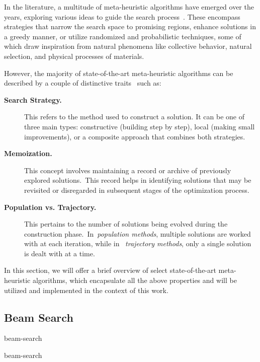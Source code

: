 In the literature, a multitude of meta-heuristic algorithms have emerged over
the years, exploring various ideas to guide the search
process~\cite{osman1996metaheuristics}. These encompass strategies that narrow
the search space to promising regions, enhance solutions in a greedy manner, or
utilize randomized and probabilistic techniques, some of which draw inspiration
from natural phenomena like collective behavior, natural selection, and physical
processes of materials.

However, the majority of state-of-the-art meta-heuristic algorithms can be
described by a couple of distinctive traits~\cite{blum2003metaheuristics} such as:

\begin{description}
  \item[\textbf{Search Strategy.}] This refers to the method used to construct a
    solution. It can be one of three main types: constructive (building step by
    step), local (making small improvements), or a composite approach that
    combines both strategies.

  \item[\textbf{Memoization.}] This concept involves maintaining a record or
    archive of previously explored solutions.~This record helps in identifying
    solutions that may be revisited or disregarded in subsequent stages of the
    optimization process.

  \item[\textbf{Population vs. Trajectory.}] This pertains to the number of
    solutions being evolved during the construction phase.~In~\emph{population
      methods}, multiple solutions are worked with at each iteration, while in
    ~\emph{trajectory methods}, only a single solution is dealt with at a time.
\end{description}

In this section, we will offer a brief overview of select state-of-the-art
\acrshort{meta-heuristic} algorithms, which encapsulate all the above properties
and will be utilized and implemented in the context of this work.

\subsection{Beam Search}
\label{subsec:beam-search}

\acrfull{beam-search}~\cite{ow1988filtered,outeiro2021application}

\begin{algorithm}
  \label{algorithm:beam-search}
  \caption{\acrlong{beam-search}}
  
\end{algorithm}

